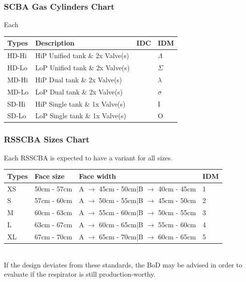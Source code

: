 \documentclass[a4paper, 12pt, oneside]{article}
\begin{document}
{				\subsubsection{SCBA Gas Cylinders Chart}
					Each 
					\begin{tabular}{|p{2cm}||p{8cm}|p{1cm}|p{1.135cm}|}
						\hline
						Types & Description & IDC & IDM \\\hline
						HD-Hi & HiP Unified tank \& 2x Valve(s) & \cellcolor[HTML]{700000} & $\Lambda$ \\
						HD-Lo & LoP Unified tank \& 2x Valve(s) & \cellcolor[HTML]{AA0000} & $\Sigma$ \\
						MD-Hi & HiP Dual tank \& 2x Valve(s) & \cellcolor[HTML]{707000} & $\lambda$ \\
						MD-Lo & LoP Dual tank \& 2x Valve(s) & \cellcolor[HTML]{AA7000} & $\sigma$ \\
						SD-Hi & HiP Single tank \& 1x Valve(s) & \cellcolor[HTML]{70AA00} & I \\
						SD-Lo & LoP Single tank \& 1x Valve(s) & \cellcolor[HTML]{AAAA00} & O \\\hline
					\end{tabular}
				\subsubsection{RSSCBA Sizes Chart}
				Each RSSCBA is expected to have a variant for all sizes.
				\begin{tabular}{|p{1cm}||p{3cm}|p{7cm}|p{1.135cm}|}
					\hline
					Types & Face size & Face width & IDM \\\hline
					XS & 50cm - 57cm & A $\rightarrow$ 45cm - 50cm|B $\rightarrow$ 40cm - 45cm & \textcircled{\footnotesize 1} \\
					S & 57cm - 60cm & A $\rightarrow$ 50cm - 55cm|B $\rightarrow$ 45cm - 50cm & \textcircled{\footnotesize 2} \\
					M & 60cm - 63cm & A $\rightarrow$ 55cm - 60cm|B $\rightarrow$ 50cm - 55cm & \textcircled{\footnotesize 3} \\
					L & 63cm - 67cm & A $\rightarrow$ 60cm - 65cm|B $\rightarrow$ 55cm - 60cm & \textcircled{\footnotesize 4} \\
					XL & 67cm - 70cm & A $\rightarrow$ 65cm - 70cm|B $\rightarrow$ 60cm - 65cm & \textcircled{\footnotesize 5} \\\hline
				\end{tabular} \\
				\small *If the design deviates from these standards, the BoD may be advised in order to evaluate if the respirator is still production-worthy. \normalsize \\ \-\\
		\newpage
				
}
\end{document}
